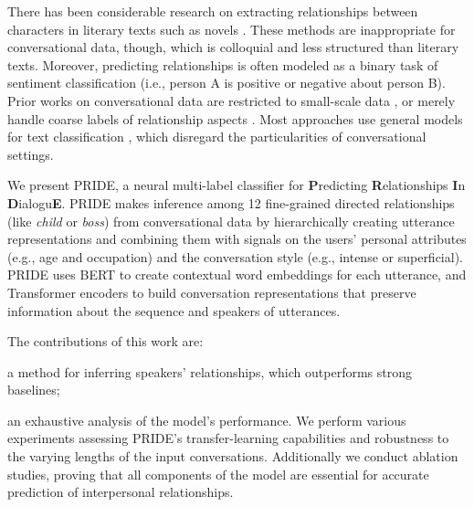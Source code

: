  There has been considerable research on extracting relationships between characters in literary texts such as novels \cite{chaturvedi2016modeling, chaturvedi2017unsupervised}. These methods are inappropriate for conversational data, though, 
which is colloquial and less structured than literary texts. 
Moreover, 
predicting relationships is often  modeled as a binary task of sentiment classification (i.e., person A is positive or negative about person B). 
Prior works on conversational data
are restricted to
small-scale data \cite{yu-etal-2020-dialogue}, or merely handle coarse labels of relationship aspects \cite{rashid2018characterizing,qamar2021relationship}. Most approaches use general models for text classification \cite{chen2020mpdd,jia2020ddrel}, which 
disregard the particularities of
conversational settings. 

 We present PRIDE, a 
neural multi-label classifier for \textbf{P}redicting \textbf{R}elationships \textbf{I}n \textbf{D}ialogu\textbf{E}. 
PRIDE makes inference among 12 fine-grained directed relationships (like \emph{child} or \emph{boss}) from conversational data by hierarchically creating utterance representations and combining them with signals on the users' personal attributes (e.g., age and occupation) and the conversation style (e.g., intense or superficial).
PRIDE uses BERT \cite{devlin2019bert} to create contextual word embeddings for each utterance, and Transformer encoders \cite{vaswani2017attention} to build conversation representations that preserve information about the sequence and speakers of utterances.

The contributions of this work are: 
\squishlist
\item a method for inferring speakers' relationships, which outperforms strong baselines; 
\item an exhaustive analysis of the model's performance. We perform various experiments assessing PRIDE's transfer-learning capabilities and robustness to the varying lengths of the input conversations. Additionally we conduct ablation studies, proving that all components of the model are essential for accurate prediction of interpersonal relationships.
\squishend